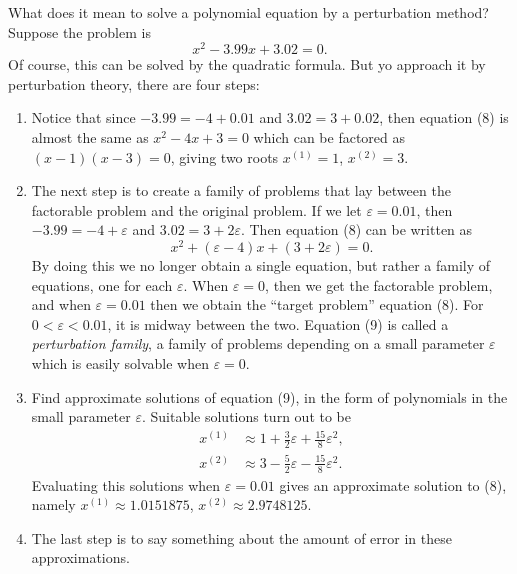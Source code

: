 \documentclass{article}
\theoremstyle{definition}
\theoremstyle{remark}
\theoremstyle{definition}
\begin{document}
What does it mean to solve a polynomial equation by a perturbation method? Suppose the problem is
    \begin{equation}
        x^2-3.99x+3.02=0.
    \end{equation}
\noindent Of course, this can be solved by the quadratic formula. But yo approach it by perturbation theory, there are four steps:
    \begin{enumerate}
        \item Notice that since $-3.99=-4+0.01$ and $3.02=3+0.02$, then equation (8) is almost the same as $x^2-4x+3=0$ which can be factored as $(x-1)(x-3)=0$, giving two roots $x^{(1)}=1$, $x^{(2)}=3$.
        \item The next step is to create a family of problems that lay between the factorable problem and the original problem. If we let $\varepsilon=0.01$, then $-3.99=-4+\varepsilon$ and $3.02=3+2\varepsilon$. Then equation (8) can be written as 
            \begin{equation}
                x^2+(\varepsilon-4)x+(3+2\varepsilon)=0.
            \end{equation}
        By doing this we no longer obtain a single equation, but rather a family of equations, one for each $\varepsilon$. When $\varepsilon=0$, then we get the factorable problem, and when $\varepsilon=0.01$ then we obtain the ``target problem'' equation (8). For $0<\varepsilon<0.01$, it is midway between the two. Equation (9) is called a \textit{perturbation family}, a family of problems depending on a small parameter $\varepsilon$ which is easily solvable when $\varepsilon=0$.
        \item Find approximate solutions of equation (9), in the form of polynomials in the small parameter $\varepsilon$. Suitable solutions turn out to be 
            \begin{equation*}
                \begin{split}
                    x^{(1)}&\approx 1+\frac{3}{2}\varepsilon+\frac{15}{8}\varepsilon^2, \\
                    x^{(2)}&\approx 3-\frac{5}{2}\varepsilon-\frac{15}{8}\varepsilon^2.
                \end{split}
            \end{equation*}
        Evaluating this solutions when $\varepsilon=0.01$ gives an approximate solution to (8), namely $x^{(1)}\approx 1.0151875$, $x^{(2)}\approx 2.9748125$.
        \item The last step is to say something about the amount of error in these approximations.
    \end{enumerate}
    
\end{document}
